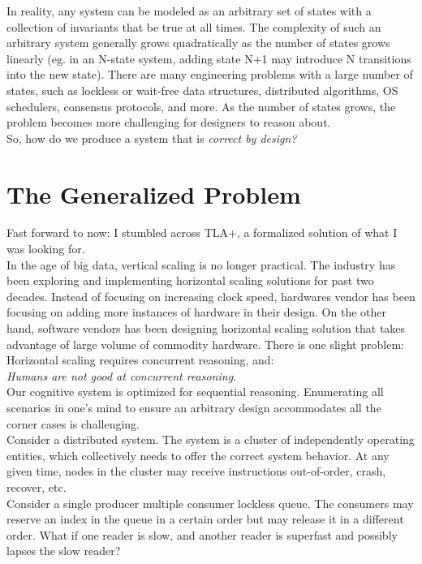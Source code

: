 In reality, any system can be modeled as an arbitrary set of states with a
collection of invariants that be true at all times. The complexity of such an
arbitrary system generally grows quadratically as the number of states grows
linearly (eg. in an N-state system, adding state N+1 may introduce N
transitions into the new state). There are many engineering problems with a
large number of states, such as lockless or wait-free data structures,
distributed algorithms, OS schedulers, consensus protocols, and more. As the
number of states grows, the problem becomes more challenging for designers to
reason about.\\

So, how do we produce a system that is \textit{correct by design?} 

\section{The Generalized Problem}

Fast forward to now: I stumbled across TLA+, a formalized solution of what I
was looking for.\\

In the age of big data, vertical scaling is no longer practical. The industry
has been exploring and implementing horizontal scaling solutions for past two
decades. Instead of focusing on increasing clock speed, hardwares vendor has
been focusing on adding more instances of hardware in their design. On the
other hand, software vendors has been designing horizontal scaling solution that
takes advantage of large volume of commodity hardware. There is one slight
problem: Horizontal scaling requires concurrent reasoning, and:\\

\textit{Humans are not good at concurrent reasoning}.\\

Our cognitive system is optimized for sequential reasoning. Enumerating
all scenarios in one's mind to ensure an arbitrary design accommodates all
the corner cases is challenging.\\

Consider a distributed system. The system is a cluster of independently
operating entities, which collectively needs to offer the correct system
behavior. At any given time, nodes in the cluster may receive instructions
out-of-order, crash, recover, etc.\\

Consider a single producer multiple consumer lockless queue. The consumers may
reserve an index in the queue in a certain order but may release it in a
different order. What if one reader is slow, and another reader is superfast
and possibly lapses the slow reader?\\

